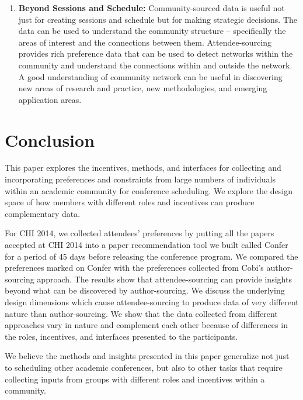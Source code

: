 \documentclass[letterpaper]{article}
\begin{document}
\begin{enumerate}
\item \textbf{Beyond Sessions and Schedule:} Community-sourced data is useful not just for creating sessions and schedule but for making strategic decisions. The data can be used to understand the community structure -- specifically the areas of interest and the connections between them. Attendee-sourcing provides rich preference data that can be used to detect networks within the community and understand the connections within and outside the network. A good understanding of community network can be useful in discovering new areas of research and practice, new methodologies, and emerging application areas.
\end{enumerate}
\section{Conclusion}
This paper explores the incentives, methods, and interfaces for collecting and incorporating preferences and constraints from large numbers of individuals within an academic community for conference scheduling. We explore the design space of how members with different roles and incentives can produce complementary data.

For CHI 2014, we collected attendees' preferences by putting all the papers accepted at CHI 2014 into a paper recommendation tool we built called Confer for a period of 45 days before releasing the conference program. We compared the preferences marked on Confer with the preferences collected from Cobi's author-sourcing approach. The results show that attendee-sourcing can provide insights beyond what can be discovered by author-sourcing. We discuss the underlying design dimensions which cause attendee-sourcing to produce data of very different nature than author-sourcing. We show that the data collected from different approaches vary in nature and complement each other because of differences in the roles, incentives, and interfaces presented to the participants.

We believe the methods and insights presented in this paper generalize not just to scheduling other academic conferences, but also to other tasks that require collecting inputs from groups with different roles and incentives within a community.


\end{document}
